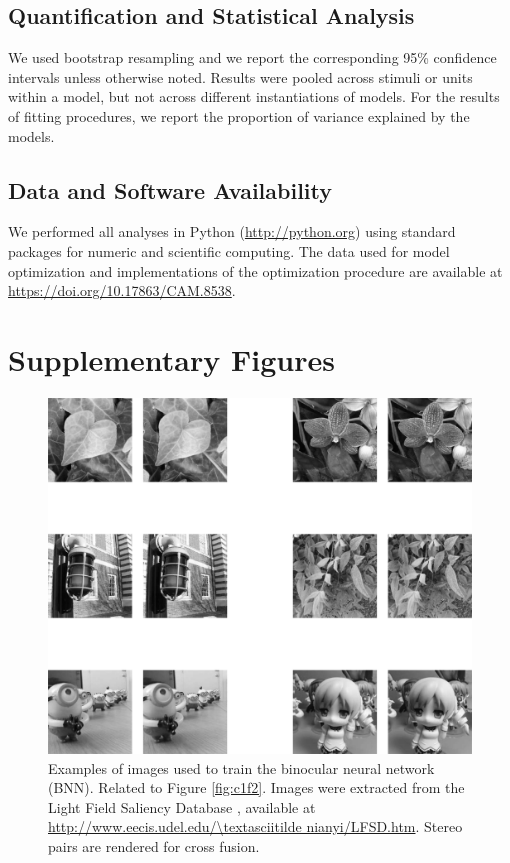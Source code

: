 \subsection*{Quantification and Statistical Analysis}
We used bootstrap resampling and we report the corresponding 95\% confidence intervals unless otherwise noted. Results were pooled across stimuli or units within a model, but not across different instantiations of models. For the results of fitting procedures, we report the proportion of variance explained by the models.

\subsection*{Data and Software Availability}
We performed all analyses in Python (\url{http://python.org}) using standard packages for numeric and scientific computing. The data used for model optimization and implementations of the optimization procedure are available at \url{https://doi.org/10.17863/CAM.8538}.

\clearpage

\section{Supplementary Figures}

\begin{figure}[!h]
  \centering
  \includegraphics{FigS1.png}
  \caption[Exemplars used to train the binocular neural network.]{Examples of images used to train the binocular neural network (BNN). Related to Figure \ref{fig:c1f2}. Images were extracted from the Light Field Saliency Database \cite{Li:2014ik}, available at \url{http://www.eecis.udel.edu/\textasciitilde nianyi/LFSD.htm}. Stereo pairs are rendered for cross fusion.}
  \label{fig:c1fs1}
\end{figure}

